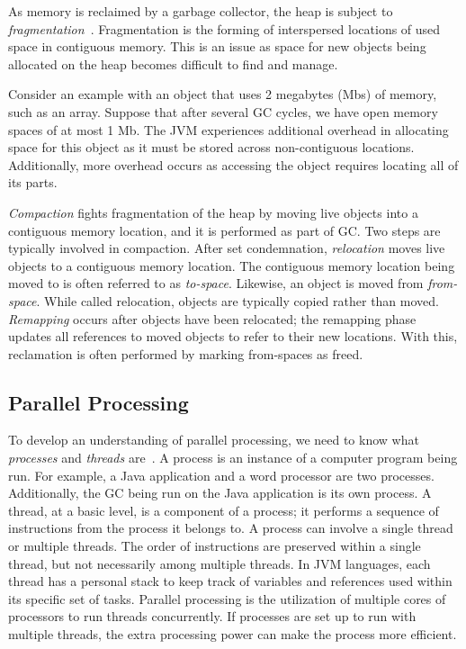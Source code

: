 \documentclass{sig-alternate}
\begin{document}
As memory is reclaimed by a garbage collector, the heap is subject to 
\emph{fragmentation}~\cite{Tene:C4,Iyengar:Collie,Osterlund:FPP}. Fragmentation is the forming
of interspersed locations of used space in contiguous memory. This
is an issue as space for new objects being allocated
on the heap becomes difficult to find and manage. 

Consider an example with an object that uses 2 megabytes (Mbs) of memory, 
such as an array. Suppose that after several GC cycles,
we have open memory spaces of at most 1 Mb. 
The JVM experiences additional overhead in allocating space for this object
as it must be stored across non-contiguous locations. Additionally,
more overhead occurs as accessing the object requires locating
all of its parts.

\emph{Compaction} fights
fragmentation of the heap by moving live objects into a contiguous memory location, and
it is performed as part of GC. Two steps
are typically involved in compaction. After set condemnation, \emph{relocation} moves live objects
to a contiguous memory location.
The contiguous memory location being moved to is often referred to as \emph{to-space}.
Likewise, an object is moved from \emph{from-space}. While called 
relocation, objects are typically copied rather than moved. \emph{Remapping}
occurs after objects have been relocated; the remapping phase 
updates all references to moved objects to refer to their new locations. With this, 
reclamation is often performed by marking from-spaces as freed.


\subsection{Parallel Processing}
\label{sec:parallelProcessing}

To develop an understanding of parallel processing, we need to know 
what \emph{processes} and \emph{threads} are~\cite{oracle:threads}.
A process is an instance of a computer program being run. 
For example, a Java application and a word processor are two processes. Additionally,
the GC being run on the Java application is its own process.
A thread, at a basic level, is a component of a process; it performs a sequence
of instructions from the process it belongs to. 
A process can involve a single thread or multiple threads. The order 
of instructions are preserved within a single thread, but 
not necessarily among multiple threads. In JVM languages,
each thread has a personal stack to keep track of variables
and references used within its specific set of tasks. 
Parallel processing is the utilization of multiple
cores of processors to run threads concurrently. If processes are set up
to run with multiple threads, the extra processing power can make 
the process more efficient.
\end{document}
